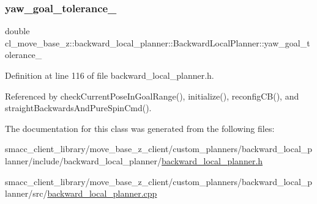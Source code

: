 \subsubsection{\texorpdfstring{yaw\+\_\+goal\+\_\+tolerance\+\_\+}{yaw\_goal\_tolerance\_}}
{\footnotesize\ttfamily double cl\+\_\+move\+\_\+base\+\_\+z\+::backward\+\_\+local\+\_\+planner\+::\+Backward\+Local\+Planner\+::yaw\+\_\+goal\+\_\+tolerance\+\_\+\hspace{0.3cm}{\ttfamily [private]}}



Definition at line 116 of file backward\+\_\+local\+\_\+planner.\+h.



Referenced by check\+Current\+Pose\+In\+Goal\+Range(), initialize(), reconfig\+C\+B(), and straight\+Backwards\+And\+Pure\+Spin\+Cmd().



The documentation for this class was generated from the following files\+:\begin{DoxyCompactItemize}
\item 
smacc\+\_\+client\+\_\+library/move\+\_\+base\+\_\+z\+\_\+client/custom\+\_\+planners/backward\+\_\+local\+\_\+planner/include/backward\+\_\+local\+\_\+planner/\hyperlink{backward__local__planner_8h}{backward\+\_\+local\+\_\+planner.\+h}\item 
smacc\+\_\+client\+\_\+library/move\+\_\+base\+\_\+z\+\_\+client/custom\+\_\+planners/backward\+\_\+local\+\_\+planner/src/\hyperlink{backward__local__planner_8cpp}{backward\+\_\+local\+\_\+planner.\+cpp}\end{DoxyCompactItemize}
